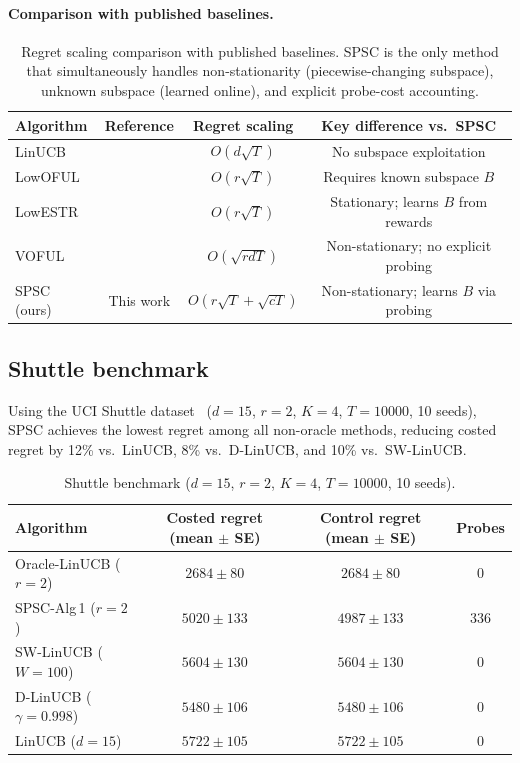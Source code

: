 \documentclass{article}
\begin{document}
\paragraph{Comparison with published baselines.}

\begin{table}[!htpb]
\centering
\small
\begin{tabular}{lccc}
\toprule
Algorithm & Reference & Regret scaling & Key difference vs.\ SPSC \\
\midrule
LinUCB          & \cite{li2010contextual}       & $O(d\sqrt{T})$        & No subspace exploitation \\
LowOFUL         & \cite{jun2019bilinear}        & $O(r\sqrt{T})$        & Requires known subspace $B$ \\
LowESTR         & \cite{lu2021low}              & $O(r\sqrt{T})$        & Stationary; learns $B$ from rewards \\
VOFUL           & \cite{cesabianchi2023colt}     & $O(\sqrt{rdT})$       & Non-stationary; no explicit probing \\
\midrule
SPSC (ours)     & This work                       & $O(r\sqrt{T} + \sqrt{cT})$ & Non-stationary; learns $B$ via probing \\
\bottomrule
\end{tabular}
\caption{Regret scaling comparison with published baselines.
SPSC is the only method that simultaneously handles non-stationarity (piecewise-changing subspace),
unknown subspace (learned online), and explicit probe-cost accounting.}
\label{tab:published_comparison}
\end{table}

\subsection{Shuttle benchmark}

Using the UCI Shuttle dataset~\citep{shuttle1995} ($d=15$, $r=2$, $K=4$, $T=10000$, 10 seeds), SPSC achieves the lowest regret among all non-oracle methods, reducing costed regret by 12\% vs.\ LinUCB, 8\% vs.\ D-LinUCB, and 10\% vs.\ SW-LinUCB.

\begin{table}[!htpb]
\centering
\small
\begin{tabular}{lccc}
\toprule
Algorithm & Costed regret (mean $\pm$ SE) & Control regret (mean $\pm$ SE) & Probes \\
\midrule
Oracle-LinUCB ($r=2$) & $2684 \pm 80$  & $2684 \pm 80$  & 0 \\
SPSC-Alg\,1 ($r=2$)  & $5020 \pm 133$ & $4987 \pm 133$ & 336 \\
SW-LinUCB ($W=100$)   & $5604 \pm 130$ & $5604 \pm 130$ & 0 \\
D-LinUCB ($\gamma=0.998$) & $5480 \pm 106$ & $5480 \pm 106$ & 0 \\
LinUCB ($d=15$)       & $5722 \pm 105$ & $5722 \pm 105$ & 0 \\
\bottomrule
\end{tabular}
\caption{Shuttle benchmark ($d=15$, $r=2$, $K=4$, $T=10000$, 10 seeds).}
\label{tab:shuttle_main}
\end{table}
\end{document}
